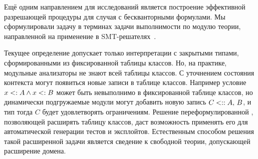 Ещё одним направлением для исследований является построение эффективной разрешающей процедуры для случая с бескванторными формулами. Мы сформулировали задачу \subtypesat{} в терминах задачи выполнимости по модулю теории, направленной на применение в SMT-решателях~\cite{barrett2018satisfiability,de2011satisfiability}.

Текущее определение \subtypesat{} допускает только интерпретации с закрытыми типами, сформированными из фиксированной таблицы классов. Но, на практике, модульные анализаторы не знают всей таблицы классов. С уточнением состояния контекста могут появиться новые записи в таблице классов. Например условие ${x} <: A \land {x} <: B$ может быть невыполнимо в фиксированной таблице классов, но динамически подгружаемые модули могут добавить новую запись $C <:: A,\, B$, и тип тогда $C$ будет удовлетворять ограничениям. Решение переформулированной \subtypesat{}, позволяющей расширять таблицу классов, даст возможность применять его для автоматической генерации тестов и эксплойтов. Естественным способом решения такой расширенной задачи является сведение \subtypesat{} к свободной теории, допускающей расширение домена.
